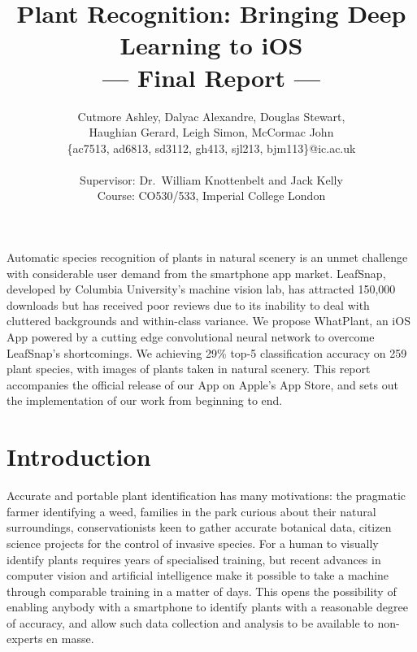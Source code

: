 \documentclass[a4paper,11pt]{article}
\title{Plant Recognition: Bringing Deep Learning to iOS\\\Large{--- Final Report ---}}
\author{Cutmore Ashley, Dalyac Alexandre, Douglas Stewart,\\ Haughian Gerard, Leigh Simon, McCormac John\\
       \{ac7513, ad6813, sd3112, gh413, sjl213, bjm113\}@ic.ac.uk\\ \\
       \small{Supervisor: Dr.\ William Knottenbelt and Jack Kelly}\\
       \small{Course: CO530/533, Imperial College London}
}
\begin{document}
\maketitle

\abstract
{
Automatic species recognition of plants in natural scenery is an unmet challenge with considerable user demand from the smartphone app market. LeafSnap, developed by Columbia University's machine vision lab, has attracted 150,000 downloads but has received poor reviews due to its inability to deal with cluttered backgrounds and within-class variance. We propose WhatPlant, an iOS App powered by a cutting edge convolutional neural network to overcome LeafSnap's shortcomings. We achieving 29\% top-5 classification accuracy on 259 plant species, with images of plants taken in natural scenery. This report accompanies the official release of our App on Apple's App Store, and sets out the implementation of our work from beginning to end.
}

\clearpage
\tableofcontents
\clearpage

\section{Introduction}

Accurate and portable plant identification has many motivations: the pragmatic farmer identifying a weed, families in the park curious about their natural surroundings, conservationists keen to gather accurate botanical data, citizen science projects for the control of invasive species. For a human to visually identify plants requires years of specialised training, but recent advances in computer vision and artificial intelligence make it possible to take a machine through comparable training in a matter of days. This opens the possibility of enabling anybody with a smartphone to identify plants with a reasonable degree of accuracy, and allow such data collection and analysis to be available to non-experts en masse.
\end{document}
